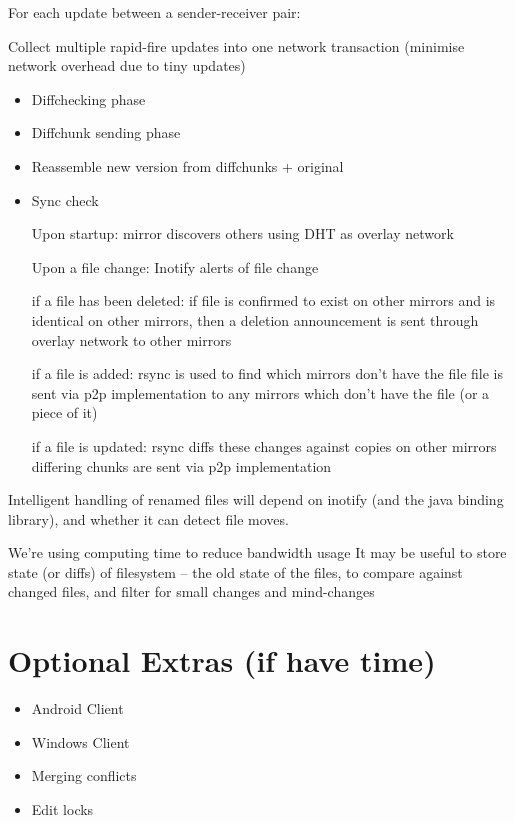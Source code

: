 \documentclass[12pt,a4paper,]{adreport}
\begin{document}
For each update between a sender-receiver pair:

Collect multiple rapid-fire updates into one network transaction
(minimise network overhead due to tiny updates)

\begin{itemize}
\item
  Diffchecking phase
\item
  Diffchunk sending phase
\item
  Reassemble new version from diffchunks + original
\item
  Sync check

  Upon startup: mirror discovers others using DHT as overlay network

  Upon a file change: Inotify alerts of file change

  if a file has been deleted: if file is confirmed to exist on other
  mirrors and is identical on other mirrors, then a deletion
  announcement is sent through overlay network to other mirrors

  if a file is added: rsync is used to find which mirrors don't have the
  file file is sent via p2p implementation to any mirrors which don't
  have the file (or a piece of it)

  if a file is updated: rsync diffs these changes against copies on
  other mirrors differing chunks are sent via p2p implementation
\end{itemize}

Intelligent handling of renamed files will depend on inotify (and the
java binding library), and whether it can detect file moves.

We're using computing time to reduce bandwidth usage It may be useful to
store state (or diffs) of filesystem -- the old state of the files, to
compare against changed files, and filter for small changes and
mind-changes

\chapter{Optional Extras (if have
time)}\label{optional-extras-if-have-time}

\begin{itemize}
\itemsep1pt\parskip0pt
\item
  Android Client
\item
  Windows Client
\item
  Merging conflicts
\item
  Edit locks
\end{itemize}
\end{document}
